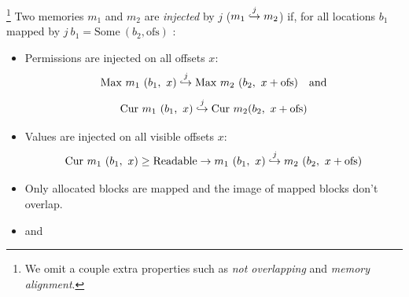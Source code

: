 \begin{definition}\footnote{We omit a couple extra properties such as \emph{not overlapping} and \emph{memory alignment}.} Two memories $m_1$ and $m_2$ are \emph{injected} by $j$ ($m_1 \overset{j}{\hookrightarrow} m_2 $) if, for all locations $b_1$ mapped by $j \ b_1 = \text{Some}\ (b_2, \text{ofs})$ :
\begin{itemize}
\item Permissions are injected on all offsets $x$: 
$$\text{Max}\ m_1\ (b_1,\ x)  \overset{j}{\hookrightarrow} \text{Max}\ m_2\ (b_2,\ x + \text{ofs}) \ \ \ \text{and}$$ $$\text{Cur}\ m_1\ (b_1,\ x)  \overset{j}{\hookrightarrow} \text{Cur}\ m_2 (b_2,\ x + \text{ofs})$$

\item Values are injected on all visible offsets $x$: 
$$\text{Cur}\ m_1\ (b_1,\ x)  \geq \text{Readable} \rightarrow m_1\ (b_1,\ x)  \overset{j}{\hookrightarrow} m_2\ (b_2,\ x + \text{ofs})$$

\item Only allocated blocks are mapped and the image of mapped blocks don't overlap.

\item {} and  \cite{appel14:plcc}  

\end{itemize}
\end{definition}







   
